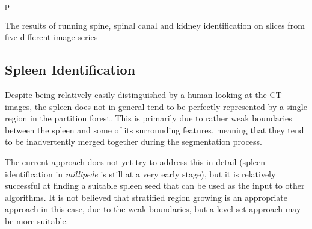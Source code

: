 \begin{stusubfig}{p}
	\\
\caption{The results of running spine, spinal canal and kidney identification on slices from five different image series}
\label{fig:featureid-3d-kidneysidentification-results}
\end{stusubfig}

\afterpage{\clearpage}
\newpage

\subsection{Spleen Identification}


\noindent Despite being relatively easily distinguished by a human looking at the CT images, the spleen does not in general tend to be perfectly represented by a single region in the partition forest. This is primarily due to rather weak boundaries between the spleen and some of its surrounding features, meaning that they tend to be inadvertently merged together during the segmentation process.

The current approach does not yet try to address this in detail (spleen identification in \emph{millipede} is still at a very early stage), but it is relatively successful at finding a suitable spleen seed that can be used as the input to other algorithms. It is not believed that stratified region growing is an appropriate approach in this case, due to the weak boundaries, but a level set approach may be more suitable.

